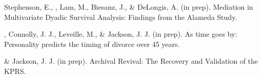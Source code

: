 \item Stephenson, E., \meb, Lam, M., Biesanz, J., \& DeLongis, A. (in prep). Mediation in Multivariate Dyadic Survival Analysis: Findings from the Alameda Study. %
\item\meb, Connolly, J. J., Leveille, M., \& Jackson, J. J. (in prep). As time goes by: Personality predicts the timing of divorce over 45 years. %
\item \meb \& Jackson, J. J. (in prep). Archival Revival: The Recovery and Validation of the KPRS.
\vspace{-2mm}\begin{center}\end{center} \vspace{-4mm}